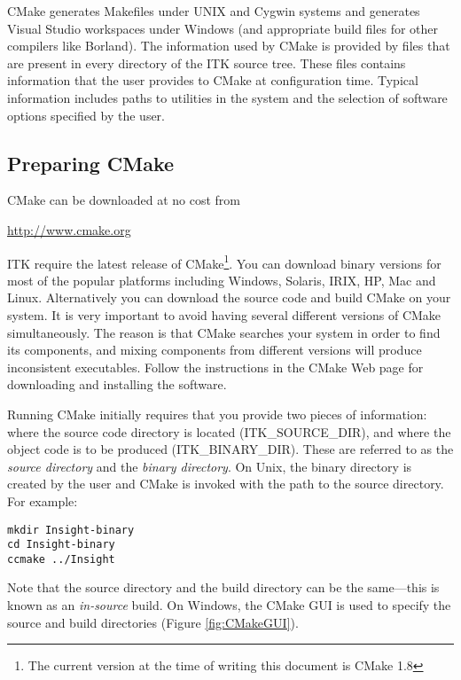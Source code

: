 CMake generates Makefiles under UNIX and Cygwin systems and generates Visual
Studio workspaces under Windows (and appropriate build files for other
compilers like Borland). The information used by CMake is provided by
 files that are present in every directory of the ITK
source tree. These files contains information that the user
provides to CMake at configuration time. Typical information includes paths
to utilities in the system and the selection of software options specified by
the user.

\subsection{Preparing CMake}
\label{sec:CMakeforITK}
 

CMake can be downloaded at no cost from 
\begin{center} 
  \url{http://www.cmake.org}
\end{center}

ITK require the latest release of CMake\footnote{The current version at the
time of writing this document is CMake 1.8}. You can download binary
versions for most of the popular platforms including Windows, Solaris, IRIX,
HP, Mac and Linux. Alternatively you can download the source code and build
CMake on your system. It is very important to avoid having several different
versions of CMake simultaneously. The reason is that CMake searches your
system in order to find its components, and mixing components from different
versions will produce inconsistent executables. Follow the instructions in the
CMake Web page for downloading and installing the software.

Running CMake initially requires that you provide two pieces of information:
where the source code directory is located (ITK\_SOURCE\_DIR), and where the
object code is to be produced (ITK\_BINARY\_DIR). These are referred to as the
\emph{source directory} and the \emph{binary directory}. On Unix, the binary
directory is created by the user and CMake is invoked with the path to the
source directory. For example:

\small
\begin{verbatim}
mkdir Insight-binary
cd Insight-binary
ccmake ../Insight
\end{verbatim}
\normalsize

Note that the source directory and the build directory can be the
same---this is known as an \emph{in-source} build. On Windows, the CMake 
GUI is used to specify the source and build directories (Figure
\ref{fig:CMakeGUI}).

